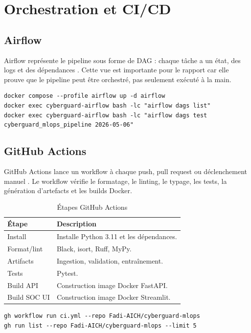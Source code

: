 \chapter{Orchestration et CI/CD}

\section{Airflow}
Airflow représente le pipeline sous forme de DAG : chaque tâche a un état, des logs et des dépendances \cite{airflow_tasks}. Cette vue est importante pour le rapport car elle prouve que le pipeline peut être orchestré, pas seulement exécuté à la main.


\begin{lstlisting}
docker compose --profile airflow up -d airflow
docker exec cyberguard-airflow bash -lc "airflow dags list"
docker exec cyberguard-airflow bash -lc "airflow dags test cyberguard_mlops_pipeline 2026-05-06"
\end{lstlisting}

\section{GitHub Actions}
GitHub Actions lance un workflow à chaque push, pull request ou déclenchement manuel \cite{github_actions_syntax}. Le workflow vérifie le formatage, le linting, le typage, les tests, la génération d'artefacts et les builds Docker.


\begin{table}[H]
\centering
\caption{Étapes GitHub Actions}
\label{tab:ci_steps}
\begin{tabularx}{\linewidth}{@{}lY@{}}
\toprule
\textbf{Étape} & \textbf{Description}\\
\midrule
Install & Installe Python 3.11 et les dépendances.\\
Format/lint & Black, isort, Ruff, MyPy.\\
Artifacts & Ingestion, validation, entraînement.\\
Tests & Pytest.\\
Build API & Construction image Docker FastAPI.\\
Build SOC UI & Construction image Docker Streamlit.\\
\bottomrule
\end{tabularx}
\end{table}

\begin{lstlisting}
gh workflow run ci.yml --repo Fadi-AICH/cyberguard-mlops
gh run list --repo Fadi-AICH/cyberguard-mlops --limit 5
\end{lstlisting}

